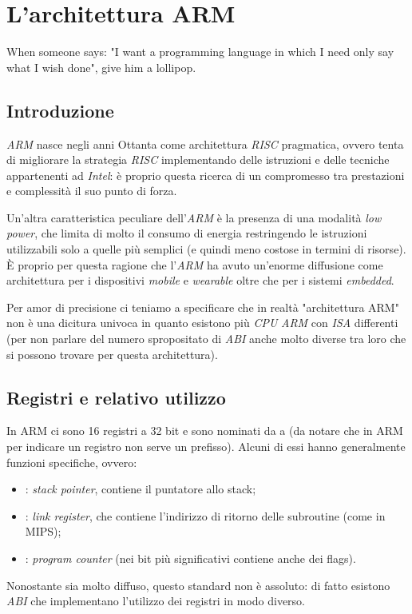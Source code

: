 \documentclass[class=book, crop=false, oneside]{standalone}
\begin{document}
\chapter{L'architettura ARM}\begin{fquote}When someone says: "I want a programming language in which I need only say what I wish done", give him a lollipop.
 \end{fquote}

\section{Introduzione}
\emph{ARM} nasce negli anni Ottanta come architettura \emph{RISC} pragmatica, ovvero tenta di migliorare la strategia \emph{RISC} implementando delle istruzioni e delle tecniche appartenenti ad \emph{Intel}: è proprio questa ricerca di un compromesso tra prestazioni e complessità il suo punto di forza.

Un'altra caratteristica peculiare dell'\emph{ARM} è la presenza di una modalità \emph{low power}, che limita di molto il consumo di energia restringendo le istruzioni utilizzabili solo a quelle più semplici (e quindi meno costose in termini di risorse). È proprio per questa ragione che l'\emph{ARM} ha avuto un'enorme diffusione come architettura per i dispositivi \emph{mobile} e \emph{wearable} oltre che per i sistemi \emph{embedded}.

Per amor di precisione ci teniamo a specificare che in realtà "architettura ARM" non è una dicitura univoca in quanto esistono più \emph{CPU} \emph{ARM} con \emph{ISA} differenti (per non parlare del numero spropositato di \emph{ABI} anche molto diverse tra loro che si possono trovare per questa architettura).

\section{Registri e relativo utilizzo}
In ARM ci sono 16 registri a 32 bit e sono nominati da  a  (da notare che in ARM per indicare un registro non serve un prefisso). Alcuni di essi hanno generalmente funzioni specifiche, ovvero:

\begin{itemize}
	\item {}: \emph{stack pointer}, contiene il puntatore allo stack;
	\item {}: \emph{link register}, che contiene l'indirizzo di ritorno delle subroutine (come  in MIPS);
	\item {}: \emph{program counter} (nei bit più significativi contiene anche dei flags).
\end{itemize}
Nonostante sia molto diffuso, questo standard non è assoluto: di fatto esistono \emph{ABI} che implementano l'utilizzo dei registri in modo diverso.
\end{document}

